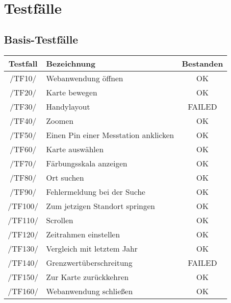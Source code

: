 \section{Testfälle}
\subsection{Basis-Testfälle}
\begin{center}
    \begin{tabular}[h]{|c|l|c|}
        \hline
        \textbf{Testfall} & \textbf{Bezeichnung} & \textbf{Bestanden} \\
        \hline
        /TF10/ & Webanwendung öffnen & \cellcolor{green!25}OK \\
        \hline
        /TF20/ & Karte bewegen & \cellcolor{green!25}OK \\
        \hline
        /TF30/ & Handylayout & \cellcolor{red!25}FAILED \\
        \hline
        /TF40/ & Zoomen & \cellcolor{green!25}OK \\
        \hline
         /TF50/ & Einen Pin einer Messtation anklicken & \cellcolor{green!25}OK \\
        \hline
        /TF60/ & Karte auswählen & \cellcolor{green!25}OK \\
        \hline
        /TF70/ & Färbungsskala anzeigen & \cellcolor{green!25}OK \\
        \hline
         /TF80/ & Ort suchen & \cellcolor{green!25}OK \\
        \hline
         /TF90/ & Fehlermeldung bei der Suche & \cellcolor{green!25}OK \\
        \hline
        /TF100/ & Zum jetzigen Standort springen & \cellcolor{green!25}OK \\
        \hline
        /TF110/ & Scrollen & \cellcolor{green!25}OK \\
        \hline
         /TF120/ & Zeitrahmen einstellen & \cellcolor{green!25}OK \\
        \hline
         /TF130/ & Vergleich mit letztem Jahr & \cellcolor{green!25}OK \\
        \hline
         /TF140/ & Grenzwertüberschreitung & \cellcolor{red!25}FAILED \\
        \hline
        /TF150/ & Zur Karte zurückkehren & \cellcolor{green!25}OK \\
        \hline
         /TF160/ & Webanwendung schließen & \cellcolor{green!25}OK \\
        \hline

    \end{tabular}
\end{center}

